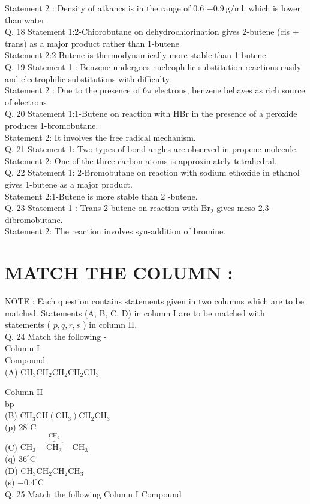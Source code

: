 \documentclass[10pt]{article}
\begin{document}
Statement 2 : Density of atkancs is in the range of 0.6 $-0.9 \mathrm{~g} / \mathrm{ml}$, which is lower than water.\\
Q. 18 Statement 1:2-Chiorobutane on dehydrochiorination gives 2-butene (cis + trans) as a major product rather than 1-butene\\
Statement 2:2-Butene is thermodynamically more stable than 1-butene.\\
Q. 19 Statement 1 : Benzene undergoes nucleophilic substitution reactions easily and electrophilic substitutions with difficulty.\\
Statement 2 : Due to the presence of $6 \pi$ electrons, benzene behaves as rich source of electrons\\
Q. 20 Statement 1:1-Butene on reaction with HBr in the presence of a peroxide produces 1-bromobutane.\\
Statement 2: It involves the free radical mechanism.\\
Q. 21 Statement-1: Two types of bond angles are observed in propene molecule.\\
Statement-2: One of the three carbon atoms is approximately tetrahedral.\\
Q. 22 Statement 1: 2-Bromobutane on reaction with sodium ethoxide in ethanol gives 1-butene as a major product.\\
Statement 2:1-Butene is more stable than 2 -butene.\\
Q. 23 Statement 1 : Trans-2-butene on reaction with $\mathrm{Br}_{2}$ gives meso-2,3-dibromobutane.\\
Statement 2: The reaction involves syn-addition of bromine.

\section*{MATCH THE COLUMN :}
NOTE : Each question contains statements given in two columns which are to be matched. Statements (A, B, C, D) in column I are to be matched with statements ( $p, q, r, s$ ) in column II.\\
Q. 24 Match the following -\\
Column I\\
Compound\\
(A) $\mathrm{CH}_{3} \mathrm{CH}_{2} \mathrm{CH}_{2} \mathrm{CH}_{2} \mathrm{CH}_{3}$

Column II\\
bp\\
(B) $\mathrm{CH}_{3} \mathrm{CH}\left(\mathrm{CH}_{3}\right) \mathrm{CH}_{2} \mathrm{CH}_{3}$\\
(p) $28^{\circ} \mathrm{C}$\\
(C) $\mathrm{CH}_{3}-\overbrace{\mathrm{CH}_{3}}^{\mathrm{CH}_{3}}-\mathrm{CH}_{3}$\\
(q) $36^{\circ} \mathrm{C}$\\
(D) $\mathrm{CH}_{3} \mathrm{CH}_{2} \mathrm{CH}_{2} \mathrm{CH}_{3}$\\
(s) $-0.4^{\circ} \mathrm{C}$\\
Q. 25 Match the following Column I Compound
\end{document}

